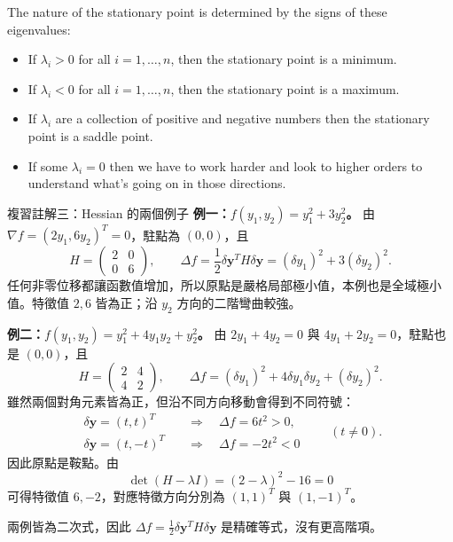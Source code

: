 \documentclass[11pt,a4paper,twoside]{article}
\newcommand{\pnum}[1]{\makebox[0pt][r]{\scriptsize\textbf{[#1]}\hspace{0.7em}}}
\newcommand{\StudyNote}[2]{\begin{studyNote}{#1}#2\end{studyNote}}
\begin{document}
\noindent\pnum{47}The nature of the stationary point is determined by the signs of these eigenvalues:
\begin{itemize}
    \item If $\lambda_i>0$ for all $i=1,\ldots,n$, then the stationary point is a minimum.
    \item If $\lambda_i<0$ for all $i=1,\ldots,n$, then the stationary point is a maximum.
    \item If $\lambda_i$ are a collection of positive and negative numbers then the stationary point is a saddle point.
    \item If some $\lambda_i=0$ then we have to work harder and look to higher orders to understand what's going on in those directions.
\end{itemize}

\StudyNote{複習註解三：Hessian 的兩個例子}{
    \textbf{例一：$f(y_1,y_2)=y_1^2+3y_2^2$。}
    由 $\nabla f=(2y_1,6y_2)^T=0$，駐點為 $(0,0)$，且
    \[
        H=\begin{pmatrix}2&0\\0&6\end{pmatrix},
        \qquad
        \Delta f=\frac12\delta\mathbf y^TH\delta\mathbf y
        =(\delta y_1)^2+3(\delta y_2)^2.
    \]
    任何非零位移都讓函數值增加，所以原點是嚴格局部極小值，本例也是全域極小值。特徵值 $2,6$ 皆為正；沿 $y_2$ 方向的二階彎曲較強。

    \textbf{例二：$f(y_1,y_2)=y_1^2+4y_1y_2+y_2^2$。}
    由 $2y_1+4y_2=0$ 與 $4y_1+2y_2=0$，駐點也是 $(0,0)$，且
    \[
        H=\begin{pmatrix}2&4\\4&2\end{pmatrix},
        \qquad
        \Delta f=(\delta y_1)^2+4\delta y_1\delta y_2+(\delta y_2)^2.
    \]
    雖然兩個對角元素皆為正，但沿不同方向移動會得到不同符號：
    \[
        \begin{aligned}
            \delta\mathbf y=(t,t)^T  & \quad\Longrightarrow\quad\Delta f=6t^2>0, \\
            \delta\mathbf y=(t,-t)^T & \quad\Longrightarrow\quad\Delta f=-2t^2<0
        \end{aligned}
        \qquad(t\neq0).
    \]
    因此原點是鞍點。由
    \[
        \det(H-\lambda I)=(2-\lambda)^2-16=0
    \]
    可得特徵值 $6,-2$，對應特徵方向分別為 $(1,1)^T$ 與 $(1,-1)^T$。

    兩例皆為二次式，因此 $\Delta f=\tfrac12\delta\mathbf y^TH\delta\mathbf y$ 是精確等式，沒有更高階項。
}
\end{document}
